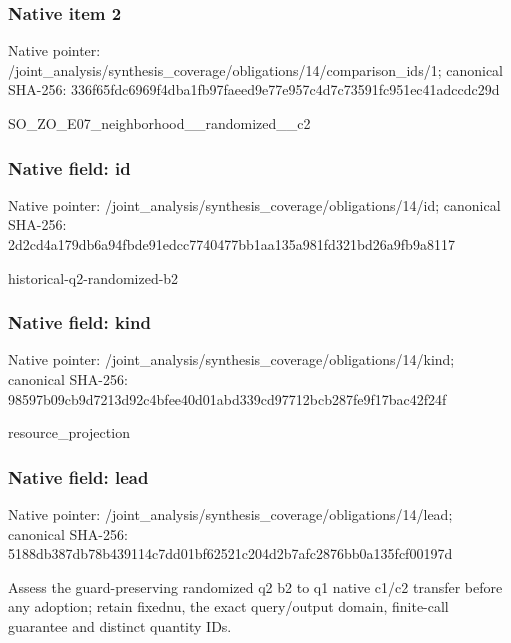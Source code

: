 \documentclass[10pt,a4paper]{article}
\begin{document}
\subsubsection{Native item 2}
Native pointer: /joint\_\allowbreak{}analysis/synthesis\_\allowbreak{}coverage/obligations/14/comparison\_\allowbreak{}ids/1; canonical SHA-256: 336f65fdc6969f4dba1fb97faeed9e77e957c4d7c73591fc951ec41adccdc29d

\begingroup\raggedright\sloppy SO\_\allowbreak{}ZO\_\allowbreak{}E07\_\allowbreak{}neighborhood\_\allowbreak{}\_\allowbreak{}randomized\_\allowbreak{}\_\allowbreak{}c2\par\endgroup

\subsubsection{Native field: id}
Native pointer: /joint\_\allowbreak{}analysis/synthesis\_\allowbreak{}coverage/obligations/14/id; canonical SHA-256: 2d2cd4a179db6a94fbde91edcc7740477bb1aa135a981fd321bd26a9fb9a8117

\begingroup\raggedright\sloppy historical-q2-randomized-b2\par\endgroup

\subsubsection{Native field: kind}
Native pointer: /joint\_\allowbreak{}analysis/synthesis\_\allowbreak{}coverage/obligations/14/kind; canonical SHA-256: 98597b09cb9d7213d92c4bfee40d01abd339cd97712bcb287fe9f17bac42f24f

\begingroup\raggedright\sloppy resource\_\allowbreak{}projection\par\endgroup

\subsubsection{Native field: lead}
Native pointer: /joint\_\allowbreak{}analysis/synthesis\_\allowbreak{}coverage/obligations/14/lead; canonical SHA-256: 5188db387db78b439114c7dd01bf62521c204d2b7afc2876bb0a135fcf00197d

\begingroup\raggedright\sloppy Assess the guard-preserving randomized q2 b2 to q1 native c1/\allowbreak{}c2 transfer before any adoption;\allowbreak{} retain fixednu,\allowbreak{} the exact query/\allowbreak{}output domain,\allowbreak{} finite-call guarantee and distinct quantity IDs.\par\endgroup
\end{document}

